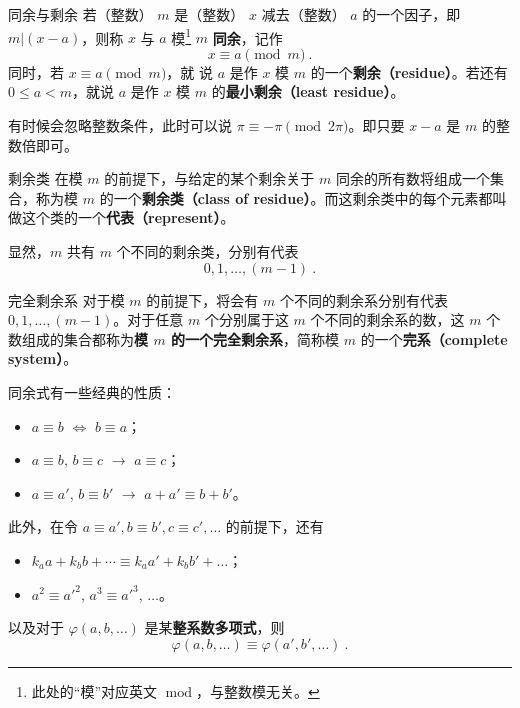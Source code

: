 

\begin{definition}{同余与剩余}
若（整数） $m$ 是（整数） $x$ 减去（整数） $a$ 的一个因子，即 $m | (x-a)$，则称 $x$ 与 $a$ 模\footnote{此处的“模”对应英文 $\operatorname{mod}$，与整数模无关。} $m$ \textbf{同余}，记作
\begin{equation}
x \equiv a \pmod m ~.
\end{equation}
同时，若 $x \equiv a \pmod m$，就 说 $a$ 是作 $x$ 模 $m$ 的一个\textbf{剩余（residue）}。若还有 $0 \le a < m$，就说 $a$ 是作 $x$ 模 $m$ 的\textbf{最小剩余（least residue）}。
\end{definition}
有时候会忽略整数条件，此时可以说 $\pi \equiv -\pi \pmod{2\pi}$。即只要 $x-a$ 是 $m$ 的整数倍即可。

\begin{definition}{剩余类}
在模 $m$ 的前提下，与给定的某个剩余关于 $m$ 同余的所有数将组成一个集合，称为模 $m$ 的一个\textbf{剩余类（class of residue）}。而这剩余类中的每个元素都叫做这个类的一个\textbf{代表（represent）}。
\end{definition}

\begin{corollary}{}
显然，$m$ 共有 $m$ 个不同的剩余类，分别有代表
\begin{equation}
0, 1, \dots, (m-1) ~.
\end{equation}
\end{corollary}
\begin{definition}{完全剩余系}
对于模 $m$ 的前提下，将会有 $m$ 个不同的剩余系分别有代表 $0, 1, \dots, (m-1)$。对于任意 $m$ 个分别属于这 $m$ 个不同的剩余系的数，这 $m$ 个数组成的集合都称为\textbf{模 $m$ 的一个完全剩余系}，简称模 $m$ 的一个\textbf{完系（complete system）}。
\end{definition}

同余式有一些经典的性质：
\begin{itemize}
\item $a \equiv b$ $\Leftrightarrow$ $b \equiv a$；
\item $a \equiv b$, $b \equiv c$ $\rightarrow$ $a \equiv c$；
\item $a \equiv a'$, $b \equiv b'$ $\rightarrow$ $a + a' \equiv b + b'$。
\end{itemize}
此外，在令 $a \equiv a', b \equiv b', c \equiv c', \dots$ 的前提下，还有
\begin{itemize}
\item $k_a a + k_b b + \cdots \equiv k_a a' + k_b b' + \dots$；
\item $a^2 \equiv a'^2$, $a^3 \equiv a'^3$, $\dots$。
\end{itemize}
以及对于 $\varphi(a, b, \dots)$ 是某\textbf{整系数多项式}，则
$$\varphi(a, b, \dots) \equiv \varphi(a', b', \dots) ~.$$

